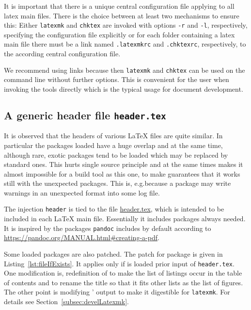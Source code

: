 It is important that there is a unique central configuration file 
applying to all latex main files. 
There is the choice between at least two mechanisms to ensure this: 
Either \texttt{latexmk} and \texttt{chktex} 
are invoked with options \texttt{-r} and \texttt{-l}, respectively, 
specifying the configuration file explicitly 
or for each folder containing a latex main file 
there must be a link named \texttt{.latexmkrc} and \texttt{.chktexrc}, respectively, 
to the according central configuration file. 

We recommend using links because then \texttt{latexmk} and \texttt{chktex} 
can be used on the command line without further options. 
This is convenient for the user when invoking the tools directly 
which is the typical usage for document development. 


\subsection{A generic header file \texttt{header.tex}}\label{subsec:header}

It is observed that the headers of various \LaTeX{} files are quite similar. 
In particular the packages loaded 
have a huge overlap and at the same time, although rare, 
exotic packages tend to be loaded which may be replaced by standard ones. 
This hurts single source principle 
and at the same times makes it almost impossible 
for a build tool as this one, 
to make guarantees that it works still with the unexpected packages. 
This is, e.g.\@ because a package may write warnings 
in an unexpected format into some log file. 

The injection \texttt{header} 
is tied to the file \href{\urlSite fromTex/header.tex}{header.tex}, 
which is intended to be included in each \LaTeX{} main file. 
Essentially it includes packages always needed. 
It is inspired by the packages \texttt{pandoc} includes by default 
according to \url{https://pandoc.org/MANUAL.html#creating-a-pdf}. 

Some loaded packages are also patched. 
The patch for package  is given in Listing~\ref{lst:fileIfExists}. 
It applies only if  is loaded prior input of \texttt{header.tex}. 
One modification is, redefinition of  
to make the list of listings occur in the table of contents 
and to rename the title so that it fits other lists as the list of figures.  
The other point is modifying ' output to make it digestible for \texttt{latexmk}. 
For details see Section~\ref{subsec:develLatexmk}. 


